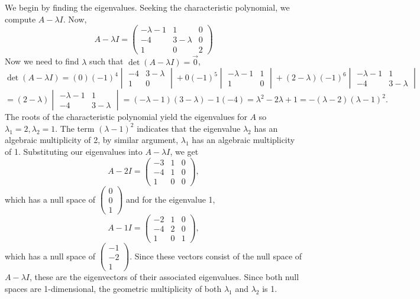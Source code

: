 \begin{solution}
  We begin by finding the eigenvalues. Seeking the characteristic polynomial, we compute \(A-\lambda I\). Now,
  \[
A-\lambda I =
\begin{pmatrix}
   -\lambda -1 & 1 & 0\\
   -4 & 3-\lambda & 0\\
   1 & 0 & 2
  \end{pmatrix}
\]
  Now we need to find \(\lambda\) such that \(\det(A-\lambda I) = \vec{0}\),
  \[
\det(A - \lambda I) = (0)(-1)^{4}
  \begin{vmatrix}
    -4 & 3-\lambda\\
    1 & 0
  \end{vmatrix}
+
  0(-1)^{5}
  \begin{vmatrix}
    -\lambda-1 & 1\\
    1 & 0
  \end{vmatrix}
  + (2-\lambda)(-1)^{6}
  \begin{vmatrix}
    -\lambda-1 & 1\\
    -4 & 3-\lambda
  \end{vmatrix}
\]
  \[
= (2-\lambda)
  \begin{vmatrix}
    -\lambda-1 & 1\\
    -4 & 3-\lambda
  \end{vmatrix}
=
  (-\lambda-1)(3-\lambda)-1(-4) = \lambda^{2} - 2\lambda + 1 = -(\lambda-2)(\lambda-1)^{2}.
\]
  The roots of the characteristic polynomial yield the eigenvalues for \(A\) so \(\lambda_{1} = 2, \lambda_{2} = 1\). The term \((\lambda-1)^{2}\) indicates that the eigenvalue \(\lambda_{2}\) has an algebraic multiplicity of 2, by similar argument, \(\lambda_{1}\) has an algebraic multiplicity of 1. Substituting our eigenvalues into \(A-\lambda I\), we get
  \[
A-2I =
  \begin{pmatrix}
    -3 & 1 & 0\\
    -4 & 1 & 0\\
    1 & 0 & 0
  \end{pmatrix}
,
\]
  which has a null space of
  \(
\begin{pmatrix}
    0 \\
    0 \\
    1
  \end{pmatrix}
\)
  and for the eigenvalue 1,
  \[
A-1I =
  \begin{pmatrix}
    -2 & 1 & 0\\
    -4 & 2 & 0\\
    1 & 0 & 1
  \end{pmatrix}
,
\]
  which has a null space of
   \(
\begin{pmatrix}
    -1\\
    -2\\
    1
  \end{pmatrix}
\). Since these vectors consist of the null space of \(A-\lambda I\), these are the eigenvectors of their associated eigenvalues. Since both null spaces are 1-dimensional, the geometric multiplicity of both \(\lambda_{1}\) and \(\lambda_{2}\) is 1.


\end{solution}
